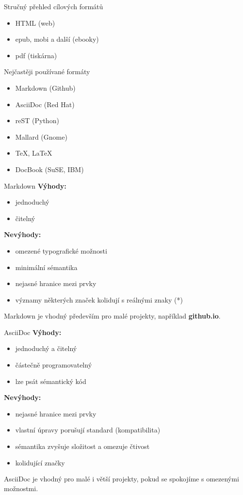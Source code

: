 \documentclass[12pt]{beamer}
\begin{document}
	\begin{frame}{Stručný přehled cílových formátů}
		\begin{itemize}
			\item HTML (web)
			\item epub, mobi a další (ebooky)
			\item pdf (tiskárna)
		\end{itemize}
	\end{frame}

	\begin{frame}{Nejčastěji používané formáty}
		\begin{itemize}
			\item Markdown (Github)
			\item AsciiDoc (Red Hat)
			\item reST (Python)
			\item Mallard (Gnome)
			\item \TeX, \LaTeX
			\item DocBook (SuSE, IBM)
		\end{itemize}
	\end{frame}

	\begin{frame}{Markdown}
	\textbf{Výhody:}
	\begin{itemize}
		\item jednoduchý
		\item čitelný
	\end{itemize}	
	\textbf{Nevýhody:}
	\begin{itemize}
		\item omezené typografické možnosti
		\item minimální sémantika
		\item nejasné hranice mezi prvky
		\item významy některých značek kolidují s reálnými znaky (*)
	\end{itemize}				
	Markdown je vhodný především pro malé projekty, například \textbf{github.io}.
	\end{frame}

	\begin{frame}{AsciiDoc}
	\textbf{Výhody:}
	\begin{itemize}
		\item jednoduchý a čitelný
		\item částečně programovatelný
		\item lze psát sémantický kód
	\end{itemize}	
	\textbf{Nevýhody:}
	\begin{itemize}
		\item nejasné hranice mezi prvky
		\item vlastní úpravy porušují standard (kompatibilita)
		\item sémantika zvyšuje složitost a omezuje čtivost
		\item kolidující značky
	\end{itemize}				
	AsciiDoc je vhodný pro malé i větší projekty, pokud se spokojíme s omezenými možnostmi.
	\end{frame}
    
\end{document}
